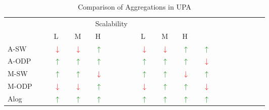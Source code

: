 \begin{table}[h]
	\caption{Comparison of Aggregations in UPA}
	\vspace{-8pt}
	\label{tab:cmp}
	\centering
	\arraybackslash
	\begin{tabular}{
	>{\centering\arraybackslash}p{0.125\linewidth}|
	>{\centering\arraybackslash}p{0.05\linewidth}|
	>{\centering\arraybackslash}p{0.05\linewidth}|
	>{\centering\arraybackslash}p{0.05\linewidth}|
	>{\centering\arraybackslash}p{0.05\linewidth}|
	>{\centering\arraybackslash}p{0.05\linewidth}|
	>{\centering\arraybackslash}p{0.05\linewidth}|
	>{\centering\arraybackslash}p{0.175\linewidth}
	}
		\toprule
        \multirow{2}{*}{} & \multicolumn{3}{l|}{ $rEFF_{SW}$ } & \multicolumn{3}{l|}{ $rEFF_{ODP}$ } & Scalability \\
        & L       & M       & H       & L        & M       & H       &             \\
		\midrule
		\hline
A-SW & \textcolor{red}{$\downarrow$} & \textcolor{red}{$\downarrow$} & \textcolor{green}{$\uparrow$} & \textcolor{red}{$\downarrow$} & \textcolor{red}{$\downarrow$} & \textcolor{green}{$\uparrow$} & \textcolor{green}{$\uparrow$} \\
		\hline
		
A-ODP & \textcolor{green}{$\uparrow$} & \textcolor{green}{$\uparrow$} & \textcolor{green}{$\uparrow$} & \textcolor{green}{$\uparrow$} & \textcolor{green}{$\uparrow$} & \textcolor{green}{$\uparrow$} & \textcolor{red}{$\downarrow$} \\
		\hline
M-SW  & \textcolor{green}{$\uparrow$} & \textcolor{green}{$\uparrow$} & \textcolor{red}{$\downarrow$} & \textcolor{green}{$\uparrow$} & \textcolor{green}{$\uparrow$} & \textcolor{red}{$\downarrow$} & \textcolor{green}{$\uparrow$} \\
		\hline
M-ODP & \textcolor{red}{$\downarrow$} & \textcolor{red}{$\downarrow$} & \textcolor{green}{$\uparrow$} & \textcolor{red}{$\downarrow$} & \textcolor{green}{$\uparrow$} & \textcolor{green}{$\uparrow$} & \textcolor{red}{$\downarrow$} \\
		\hline
Alog  & \textcolor{green}{$\uparrow$} & \textcolor{green}{$\uparrow$} & \textcolor{green}{$\uparrow$} & \textcolor{green}{$\uparrow$} & \textcolor{green}{$\uparrow$} & \textcolor{green}{$\uparrow$} & \textcolor{green}{$\uparrow$} \\
		
		\bottomrule
	\end{tabular}
\end{table}



